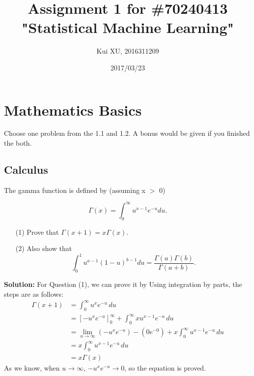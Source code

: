 \documentclass[a4paper]{article}
\title{Assignment 1 for \#70240413 \\ "Statistical Machine Learning" }
\author{Kui XU, 2016311209}
\date{2017/03/23}
\begin{document}
\maketitle

\section{Mathematics Basics}

Choose one problem from the 1.1 and 1.2. A bonus would be given if you finished the both.

\subsection{Calculus}
The gamma function is defined by (assuming x $>$ 0)

\begin{equation}
\Gamma (x) = \int^{\infty}_{0}{u^{x-1}e^{-u}du.}
\end{equation}

\begin{enumerate}
\item[(1)] Prove that $\Gamma (x + 1) =x \Gamma (x)$.
\item[(2)] Also show that 
            \begin{equation}
            \int^{1}_{0}{u^{a-1}{(1-u)}^{b-1}du=\frac{\Gamma(a)\Gamma(b)}{\Gamma (a+b)}.}
            \end{equation}
\end{enumerate}


\textbf{Solution:} For Question (1), we can prove it by Using integration by parts, the steps are as follows:
\begin{equation}
    \begin{aligned}
        \Gamma(x+1) &= \int_0^\infty u^{x} e^{-u}\,du \\
                    &= \left[-u^x e^{-u}\right]_0^\infty + \int_0^\infty x u^{x-1} e^{-u}\, du \\
                    &= \lim_{u\to \infty}(-u^x e^{-u}) - (0 e^{-0}) + x\int_0^\infty u^{x-1} e^{-u}\, du \\
                    &= x\int_0^\infty u^{x-1} e^{-u}\, du\\
                    &= x\Gamma(x)
    \end{aligned}
\end{equation}
As we know, when $u\to \infty$, $-u^x e^{-u}\to 0$, so the equation is proved.\\
\end{document}
